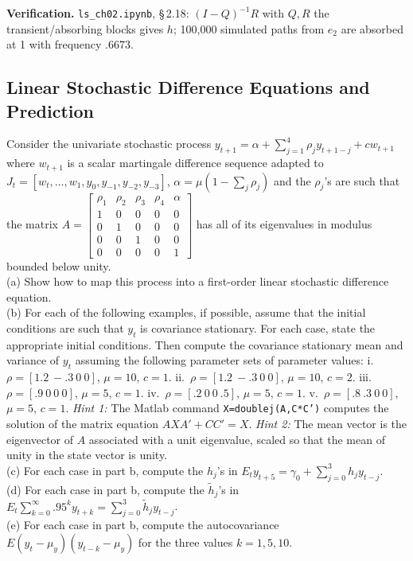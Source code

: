 \documentclass[12pt, letterpaper]{article}
\newcommand{\nb}[1]{\texttt{ls\_ch02.ipynb}, \S\,#1}
\begin{document}
\begin{tcolorbox}[evenbox,title={Exercise 2.18 \quad Random Walk}]
\textbf{Verification.} \nb{2.18}: $(I-Q)^{-1}R$ with $Q,R$ the transient/absorbing blocks gives
$h$; 100{,}000 simulated paths from $e_2$ are absorbed at 1 with frequency $.6673$. \checkmark
\end{tcolorbox}

\subsection{Linear Stochastic Difference Equations and Prediction}

\begin{tcolorbox}[evenbox,title={Exercise 2.4 \quad AR(4) with a Constant}]
\begin{tcolorbox}[questionbox]
Consider the univariate stochastic process $y_{t+1}=\alpha+\sum_{j=1}^4\rho_jy_{t+1-j}+cw_{t+1}$ where
$w_{t+1}$ is a scalar martingale difference sequence adapted to
$J_t=[w_t,\dots,w_1,y_0,y_{-1},y_{-2},y_{-3}]$, $\alpha=\mu(1-\sum_j\rho_j)$ and the $\rho_j$'s are such
that the matrix
$A=\begin{bmatrix}\rho_1&\rho_2&\rho_3&\rho_4&\alpha\\1&0&0&0&0\\0&1&0&0&0\\0&0&1&0&0\\0&0&0&0&1\end{bmatrix}$
has all of its eigenvalues in modulus bounded below unity.\\[3pt]
(a) Show how to map this process into a first-order linear stochastic difference equation.\\
(b) For each of the following examples, if possible, assume that the initial conditions are such
that $y_t$ is covariance stationary. For each case, state the appropriate initial conditions. Then
compute the covariance stationary mean and variance of $y_t$ assuming the following parameter sets
of parameter values:
i.\ $\rho=[1.2\ -.3\ 0\ 0]$, $\mu=10$, $c=1$.
ii.\ $\rho=[1.2\ -.3\ 0\ 0]$, $\mu=10$, $c=2$.
iii.\ $\rho=[.9\ 0\ 0\ 0]$, $\mu=5$, $c=1$.
iv.\ $\rho=[.2\ 0\ 0\ .5]$, $\mu=5$, $c=1$.
v.\ $\rho=[.8\ .3\ 0\ 0]$, $\mu=5$, $c=1$.
\textit{Hint 1:} The Matlab command \texttt{X=doublej(A,C*C')} computes the solution of the matrix
equation $AXA'+CC'=X$. \textit{Hint 2:} The mean vector is the eigenvector of $A$ associated with a
unit eigenvalue, scaled so that the mean of unity in the state vector is unity.\\
(c) For each case in part b, compute the $h_j$'s in $E_ty_{t+5}=\gamma_0+\sum_{j=0}^3h_jy_{t-j}$.\\
(d) For each case in part b, compute the $\tilde h_j$'s in
$E_t\sum_{k=0}^\infty.95^ky_{t+k}=\sum_{j=0}^3\tilde h_jy_{t-j}$.\\
(e) For each case in part b, compute the autocovariance $E(y_t-\mu_y)(y_{t-k}-\mu_y)$ for the three
values $k=1,5,10$.
\end{tcolorbox}


\end{tcolorbox}
\end{document}
